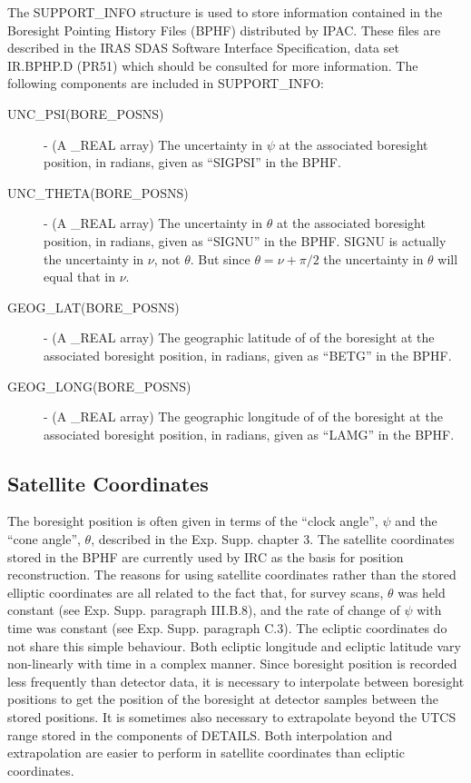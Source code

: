 The SUPPORT\_INFO structure is used to store information contained in the
Boresight Pointing History Files (BPHF) distributed by IPAC. These files are
described in the IRAS SDAS Software Interface Specification, data set IR.BPHP.D
(PR51) which should be consulted for more information. The following components
are included in SUPPORT\_INFO: 

\begin{description}

\item [UNC\_PSI(BORE\_POSNS)] - (A \_REAL array) The uncertainty in $\psi$ at
the associated boresight position, in radians, given as ``SIGPSI'' in the BPHF. 

\item [UNC\_THETA(BORE\_POSNS)] - (A \_REAL array) The uncertainty in $\theta$
at the associated boresight position, in radians, given as ``SIGNU'' in the 
BPHF. SIGNU is actually the uncertainty in $\nu$, not $\theta$. But since 
$\theta = \nu + \pi/2$ the uncertainty in $\theta$ will equal that in $\nu$.

\item [GEOG\_LAT(BORE\_POSNS)] -  (A \_REAL array) The geographic latitude of 
of the boresight at the associated boresight position, in radians, given as 
``BETG'' in the BPHF.

\item [GEOG\_LONG(BORE\_POSNS)] -  (A \_REAL array) The geographic longitude of 
of the boresight at the associated boresight position, in radians, given as 
``LAMG'' in the BPHF.

\end {description}

\subsection{Satellite Coordinates}
The boresight position is often given in terms of the ``clock angle'', $\psi$
and the ``cone angle'', $\theta$, described in the Exp. Supp. chapter 3. The
satellite coordinates stored in the BPHF are currently used by IRC as the basis
for position reconstruction. The reasons for using satellite coordinates rather
than the stored elliptic coordinates are all related to the fact that, for
survey scans, $\theta$ was held constant (see Exp. Supp. paragraph III.B.8), and
the rate of change of $\psi$ with time was constant (see Exp. Supp. paragraph
C.3). The ecliptic coordinates do not share this simple behaviour. Both ecliptic
longitude and ecliptic latitude vary non-linearly with time in a complex manner.
Since boresight position is recorded less frequently than detector data, it is
necessary to interpolate between boresight positions to get the position of the
boresight at detector samples between the stored positions. It is sometimes also
necessary to extrapolate beyond the UTCS range stored in the components of
DETAILS. Both interpolation and extrapolation are easier to perform in
satellite coordinates than ecliptic coordinates. 

